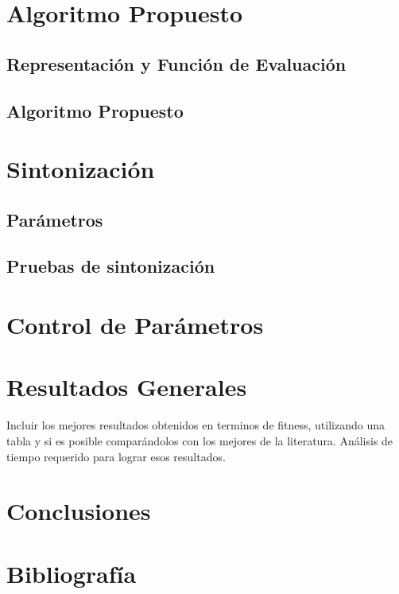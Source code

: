 \documentclass[letter, 10pt]{article}
\begin{document}
\section{Algoritmo Propuesto}

\subsection{Representación y Función de Evaluación}


\subsection{Algoritmo Propuesto}

\newpage

 
\section{Sintonización}

\subsection{Parámetros}


\subsection{Pruebas de sintonización}



\section{Control de Parámetros}



\section{Resultados Generales}
Incluir los mejores resultados obtenidos en terminos de fitness, utilizando una tabla y si es posible comparándolos con los mejores de la literatura. Análisis de tiempo requerido para lograr esos resultados.

\section{Conclusiones}



\section{Bibliografía}

\end{document}

